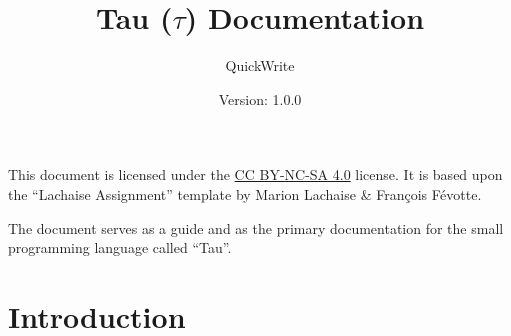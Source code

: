 \documentclass[a4paper]{article}
\title{Tau ($\tau$) Documentation} %
\author{QuickWrite} %
\date{Version: 1.0.0} %
\newcommand{\importsection}[2]{\section{#2}
}
\begin{document}
\maketitle %

This document is licensed under the \href{https://creativecommons.org/licenses/by-nc-sa/4.0/}{CC BY-NC-SA 4.0} license. 
It is based upon the ``Lachaise Assignment'' template by Marion Lachaise \& François Févotte.

The document serves as a guide and as the primary documentation for the small programming language called ``Tau''.

\tableofcontents

\importsection{sections/introduction}{Introduction}
\end{document}
